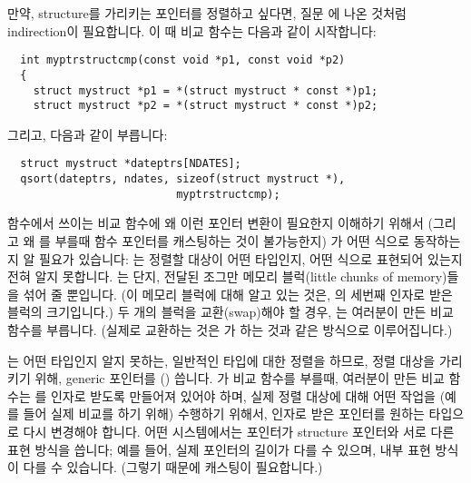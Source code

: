 \begin{faq}
	만약, structure를 가리키는 포인터를 정렬하고 싶다면, 질문 에
        나온 것처럼 indirection이 필요합니다. 이 때 비교 함수는 다음과 같이
        시작합니다:
\begin{verbatim}
  int myptrstructcmp(const void *p1, const void *p2)
  {
    struct mystruct *p1 = *(struct mystruct * const *)p1;
    struct mystruct *p2 = *(struct mystruct * const *)p2;
\end{verbatim}
	\noindent 그리고, 다음과 같이 부릅니다:
\begin{verbatim}
  struct mystruct *dateptrs[NDATES];
  qsort(dateptrs, ndates, sizeof(struct mystruct *),
                          myptrstructcmp);
\end{verbatim}
	 함수에서 쓰이는 비교 함수에 왜 이런 포인터 변환이 필요한지
        이해하기 위해서 (그리고 왜 를 부를때 함수 포인터를 캐스팅하는
        것이 불가능한지) 가 어떤 식으로 동작하는지 알 필요가 있습니다:
        는 정렬할 대상이 어떤 타입인지, 어떤 식으로 표현되어 있는지
        전혀 알지 못합니다. 는 단지, 전달된 조그만 메모리 블럭(little
        chunks of memory)들을 섞어 줄 뿐입니다. (이 메모리 블럭에 대해 알고
        있는 것은, 의 세번째 인자로 받은 블럭의 크기입니다.)
        두 개의 블럭을 교환(swap)해야 할 경우, 는 여러분이 만든
        비교 함수를 부릅니다. (실제로 교환하는 것은 가 하는 것과
        같은 방식으로 이루어집니다.)
        
        는 어떤 타입인지 알지 못하는, 일반적인 타입에 대한 정렬을
        하므로, 정렬 대상을 가리키기 위해, generic 포인터를 ()
        씁니다. 가 비교 함수를 부를때, 여러분이 만든 비교 함수는
        를 인자로 받도록 만들어져 있어야 하며, 실제 정렬 대상에
        대해 어떤 작업을 (예를 들어 실제 비교를 하기 위해) 수행하기 위해서,
        인자로 받은 포인터를 원하는 타입으로 다시 변경해야 합니다.
        어떤 시스템에서는  포인터가 structure 포인터와 서로 다른
        표현 방식을 씁니다; 예를 들어, 실제 포인터의 길이가 다를 수 있으며,
        내부 표현 방식이 다를 수 있습니다. (그렇기 때문에 캐스팅이 필요합니다.)


\end{faq}
